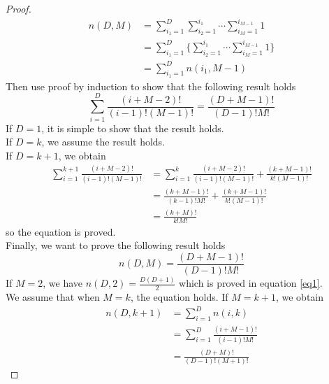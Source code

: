 \documentclass[12pt, a4paper]{article}
\newenvironment{exercise}[2][Ex]{\begin{trivlist}
\item[\hskip \labelsep {\bfseries #1}\hskip \labelsep {\bfseries #2.}]}{\end{trivlist}}
\begin{document}
\begin{exercise}{1.15(***)}
    \begin{proof}
        \begin{align*}
            n(D,M)&=\sum_{i_1=1}^D\sum_{i_2=1}^{i_1}\cdots\sum_{i_M=1}^{i_{M-1}}1\\
            &=\sum_{i_1=1}^D\{\sum_{i_2=1}^{i_1}\cdots\sum_{i_M=1}^{i_{M-1}}1\}\\
            &=\sum_{i_1=1}^Dn(i_1,M-1)
        \end{align*}
        Then use proof by induction to show that the following result holds
        \[
            \sum_{i=1}^D\frac{(i+M-2)!}{(i-1)!(M-1)!}=\frac{(D+M-1)!}{(D-1)!M!}
            \]
        If $D=1$, it is simple to show that the result holds.\\
        If $D=k$, we assume the result holds.\\
        If $D=k+1$, we obtain
        \begin{align*}
            \sum_{i=1}^{k+1}\frac{(i+M-2)!}{(i-1)!(M-1)!}&=\sum_{i=1}^k\frac{(i+M-2)!}
            {(i-1)!(M-1)!}+\frac{(k+M-1)!}{k!(M-1)!}\\
            &=\frac{(k+M-1)!}{(k-1)!M!}+\frac{(k+M-1)!}{k!(M-1)!}\\
            &=\frac{(k+M)!}{k!M!}
        \end{align*}
        so the equation is proved.\\
        Finally, we want to prove the following result holds
        \[
            n(D,M)=\frac{(D+M-1)!}{(D-1)!M!}
            \]
        If $M=2$, we have $n(D,2)=\frac{D(D+1)}{2}$ which is proved in equation \ref{eq1}.\\
        We assume that when $M=k$, the equation holds.
        If $M=k+1$, we obtain
        \begin{align*}
            n(D,k+1)&=\sum_{i=1}^Dn(i,k)\\
            &=\sum_{i=1}^D\frac{(i+M-1)!}{(i-1)!M!}\\
            &=\frac{(D+M)!}{(D-1)!(M+1)!}
        \end{align*}
    \end{proof}
\end{exercise}
\end{document}
